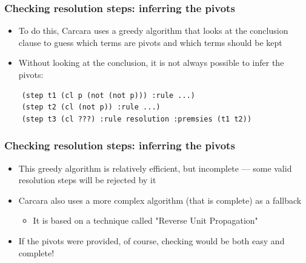\documentclass[usepdftitle=false,aspectratio=169]{beamer}
\newcommand\vitem{\vfill\item}
\begin{document}
\begin{frame}[fragile]
  \frametitle{Checking resolution steps: inferring the pivots}
  \begin{itemize}
    \item To do this, Carcara uses a greedy algorithm that looks at the
    conclusion clause to guess which terms are pivots and which terms should be
    kept
    \vitem Without looking at the conclusion, it is not always possible to infer
    the pivots:
  \end{itemize}
  \vfill
  \begin{verbatim}
    (step t1 (cl p (not (not p))) :rule ...)
    (step t2 (cl (not p)) :rule ...)
    (step t3 (cl ???) :rule resolution :premsies (t1 t2))
  \end{verbatim}
\end{frame}
\addtocounter{framenumber}{-1}
\begin{frame}
  \frametitle{Checking resolution steps: inferring the pivots}
  \begin{itemize}
    \item This greedy algorithm is relatively efficient, but incomplete --- some
    valid resolution steps will be rejected by it
    \vitem Carcara also uses a more complex algorithm (that is complete) as a
    fallback
    \begin{itemize}
      \item It is based on a technique called "Reverse Unit Propagation"
    \end{itemize}
    \pause
    \vitem If the pivots were provided, of course, checking would be both easy
    and complete!
  \end{itemize}
\end{frame}
\end{document}
